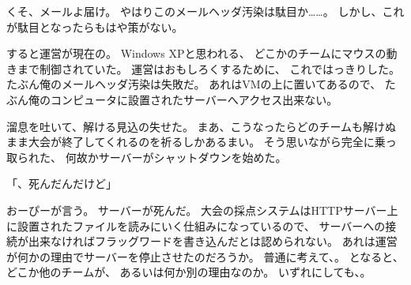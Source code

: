 くそ、メールよ届け。
やはりこのメールヘッダ汚染は駄目か……。
しかし、これが駄目となったらもはや策がない。

すると運営が現在の。
Windows XPと思われる、
どこかのチームにマウスの動きまで制御されていた。
運営はおもしろくするために、
これではっきりした。
たぶん俺のメールヘッダ汚染は失敗だ。
あれはVMの上に置いてあるので、
たぶん俺のコンピュータに設置されたサーバーへアクセス出来ない。

溜息を吐いて、解ける見込の失せた。
まあ、こうなったらどのチームも解けぬまま大会が終了してくれるのを祈るしかあるまい。
そう思いながら完全に乗っ取られた、
何故かサーバーがシャットダウンを始めた。

「\Jupiter、死んだんだけど」

おーぴーが言う。
サーバーが死んだ。
大会の採点システムはHTTPサーバー上に設置されたファイルを読みにいく仕組みになっているので、
サーバーへの接続が出来なければフラッグワードを書き込んだとは認められない。
あれは運営が何かの理由でサーバーを停止させたのだろうか。
普通に考えて、。
となると、どこか他のチームが、
あるいは何か別の理由なのか。
いずれにしても、。


